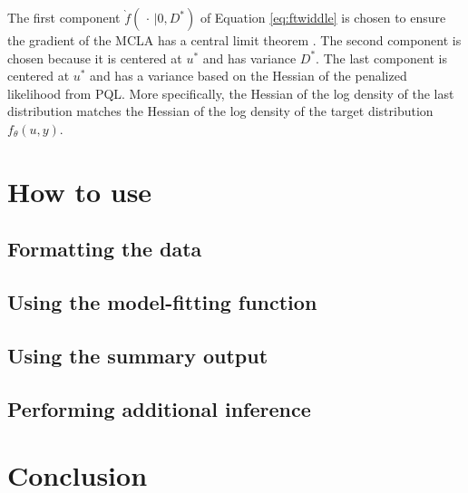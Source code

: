 \documentclass[article]{jss}
\begin{document}
The first component  $\grave{f}( \,  \cdot \, | 0, D^*)$ of Equation \ref{eq:ftwiddle}  is chosen to ensure  the gradient of the MCLA has a central limit theorem \citep{mythesis}.  The second component is chosen because it is centered at  $u^*$ and  has  variance $D^*$. The last component is centered at $u^*$ and has a variance based on the Hessian of the  penalized likelihood from PQL.  More specifically, the Hessian of the log density of the last distribution matches the Hessian of the log density of the target distribution $f_\theta(u,y)$. 





\section[How to use glmm]{How to use }\label{sec:howto}


\subsection{Formatting the data}
\subsection{Using the model-fitting function}
\subsection{Using the summary output}
\subsection{Performing additional inference}


\section{Conclusion}


\end{document}
